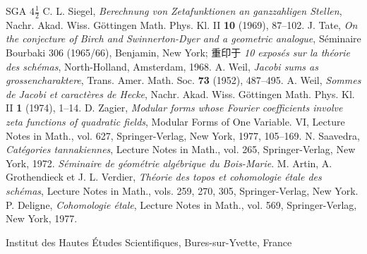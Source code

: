 \begin{thebibliography}{SGA $4\frac12$}
 C. L. Siegel, \textit{Berechnung von Zetafunktionen an ganzzahligen Stellen}, Nachr. Akad. Wiss. Göttingen Math. Phys. Kl. II \textbf{10} (1969), 87--102.
 J. Tate, \textit{On the conjecture of Birch and Swinnerton-Dyer and a geometric analogue}, Séminaire Bourbaki 306 (1965/66), Benjamin, New York; 重印于 \textit{10 exposés sur la théorie des schémas}, North-Holland, Amsterdam, 1968.
 A. Weil, \textit{Jacobi sums as grossencharaktere}, Trans. Amer. Math. Soc. \textbf{73} (1952), 487--495.
 A. Weil, \textit{Sommes de Jacobi et caractères de Hecke}, Nachr. Akad. Wiss. Göttingen Math. Phys. Kl. II \textbf{1} (1974), 1--14.
 D. Zagier, \textit{Modular forms whose Fourier coefficients involve zeta functions of quadratic fields}, Modular Forms of One Variable. VI, Lecture Notes in Math., vol. 627, Springer-Verlag, New York, 1977, 105--169.
 N. Saavedra, \textit{Catégories tannakiennes}, Lecture Notes in Math., vol. 265, Springer-Verlag, New York, 1972.
 \textit{Séminaire de géométrie algébrique du Bois-Marie}.
 M. Artin, A. Grothendieck et J. L. Verdier, \textit{Théorie des topos et cohomologie étale des schémas}, Lecture Notes in Math., vols. 259, 270, 305, Springer-Verlag, New York.
 P. Deligne, \textit{Cohomologie étale}, Lecture Notes in Math., vol. 569, Springer-Verlag, New York, 1977.
\end{thebibliography}
\begin{flushright}Institut des Hautes Études Scientifiques, Bures-sur-Yvette, France\end{flushright}
